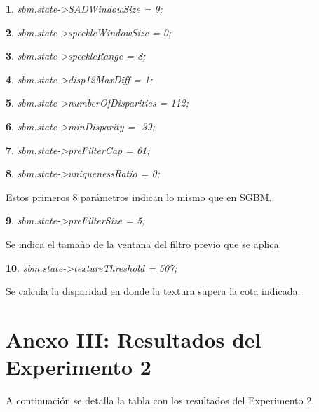 \documentclass[11pt,a4paper,titlepage]{article}
\newtheorem{mytheorem}{}
\newenvironment{theorem}%
  {\begin{lrbox}{\thmbox}%
   \begin{minipage}{\dimexpr\linewidth-2\fboxsep}
   \begin{mytheorem}}%
  {\end{mytheorem}%
   \end{minipage}%
   \end{lrbox}%
   \begin{trivlist}
     \item[]\colorbox{lightgray}{\usebox\thmbox}
   \end{trivlist}}
\begin{document}
\begin{theorem}
sbm.state->SADWindowSize = 9;
\end{theorem}
\begin{theorem}
sbm.state->speckleWindowSize = 0;
\end{theorem}
\begin{theorem}
sbm.state->speckleRange = 8;
\end{theorem}
\begin{theorem}
sbm.state->disp12MaxDiff = 1;
\end{theorem}
\begin{theorem}
sbm.state->numberOfDisparities = 112;
\end{theorem}
\begin{theorem}
sbm.state->minDisparity = -39;
\end{theorem}
\begin{theorem}
sbm.state->preFilterCap = 61;
\end{theorem}
\begin{theorem}
sbm.state->uniquenessRatio = 0;
\end{theorem}

Estos primeros 8 parámetros indican lo mismo que en SGBM.

\begin{theorem}
sbm.state->preFilterSize = 5;
\end{theorem}

Se indica el tamaño de la ventana del filtro previo que se aplica.

\begin{theorem}
sbm.state->textureThreshold = 507;
\end{theorem}

Se calcula la disparidad en donde la textura supera la cota indicada.

\newpage

\section{Anexo III: Resultados del Experimento 2}

A continuación se detalla la tabla con los resultados del Experimento 2.

\end{document}
